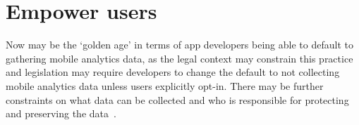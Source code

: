 \afterpage{\clearpage}

\section{Empower users}
Now may be the ‘golden age’ in terms of app developers being able to default to gathering mobile analytics data, as the legal context may constrain this practice and legislation may require developers to change the default to not collecting mobile analytics data unless users explicitly opt-in. There may be further constraints on what data can be collected and who is responsible for protecting and preserving the data~. 

